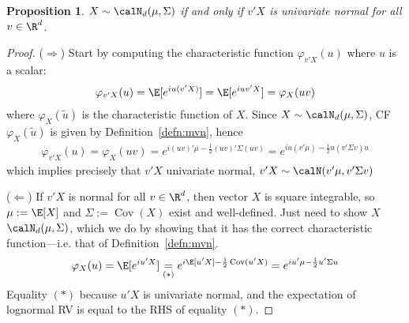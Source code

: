 \documentclass[12pt]{article}
\theoremstyle{plain}
\newtheorem{prop}[thm]{Proposition}
\theoremstyle{definition}
\theoremstyle{remark}
\newcommand{\Cov}{\operatorname{Cov}}
\begin{document}
\clearpage
\begin{prop}
$X\sim \calN_d(\mu,\Sigma)$ if and only if $v'X$ is univariate normal
for all $v\in\R^d$.
\end{prop}
\begin{proof}
($\Rightarrow$)
Start by computing the characteristic function $\varphi_{v'X}(u)$ where
$u$ is a scalar:
\begin{align*}
  \varphi_{v'X}(u)
  = \E[e^{iu(v'X)}]
  = \E[e^{iuv'X}]
  = \varphi_X(uv)
\end{align*}
where $\varphi_X(\tilde{u})$ is the characteristic function of $X$.
Since $X\sim\calN_d(\mu,\Sigma)$, CF $\varphi_X(\tilde{u})$ is given by
Definition~\ref{defn:mvn}, hence
\begin{align*}
  \varphi_{v'X}(u)
  = \varphi_X(uv)
  = e^{i(uv)'\mu-\frac{1}{2}(uv)'\Sigma(uv)}
  = e^{iu(v'\mu)-\frac{1}{2}u(v'\Sigma v)u}
\end{align*}
which implies precisely that $v'X$ univariate normal,
$v'X\sim\calN(v'\mu,v'\Sigma v)$

($\Leftarrow$)
If $v'X$ is normal for all $v\in\R^d$, then vector $X$ is square
integrable, so $\mu:=\E[X]$ and $\Sigma:=\Cov(X)$ exist and
well-defined.
Just need to show $X$ $\calN_d(\mu,\Sigma)$, which we do by showing that
it has the correct characteristic function---i.e. that of
Definition~\ref{defn:mvn}.
\begin{align*}
  \varphi_X(u)
  = \E[e^{iu'X}]
  \underset{(*)}{=} e^{i\E[u'X] - \frac{1}{2} \Cov(u'X)}
  = e^{iu'\mu - \frac{1}{2} u'\Sigma u}
\end{align*}
Equality $(*)$ because $u'X$ is univariate normal, and the expectation
of lognormal RV is equal to the RHS of equality $(*)$.
\end{proof}
\end{document}

